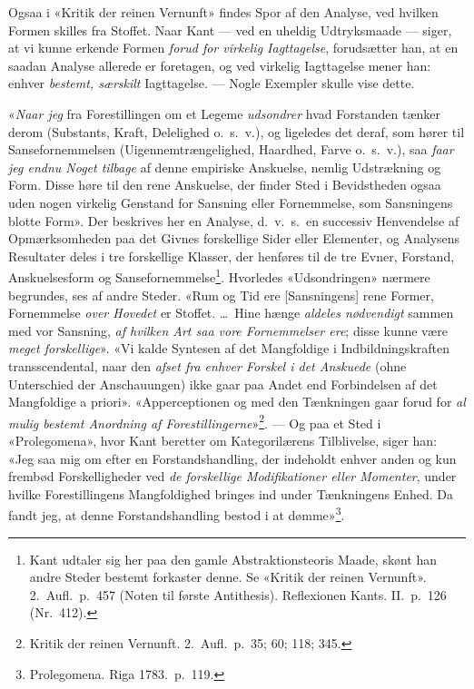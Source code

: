 \documentclass[12pt,a4paper]{article}
\begin{document}
Ogsaa i «Kritik der reinen Vernunft» findes Spor af den Analyse, ved
hvilken Formen skilles fra Stoffet. Naar Kant --- ved en uheldig
Udtryksmaade --- siger, at vi kunne erkende Formen \emph{forud for virkelig
Iagttagelse}, forudsætter han, at en saadan Analyse allerede er foretagen,
og ved virkelig Iagttagelse mener han: enhver \emph{bestemt, særskilt}
Iagttagelse. --- Nogle Exempler skulle vise dette.

«\emph{Naar jeg} fra Forestillingen om et Legeme \emph{udsondrer} hvad Forstanden
tænker derom (Substants, Kraft, Delelighed o.\ s.\ v.), og ligeledes det
deraf, som hører til Sansefornemmelsen (Uigennemtrængelighed, Haardhed,
Farve o.\ s.\ v.), saa \emph{faar jeg endnu Noget tilbage} af denne empiriske
Anskuelse, nemlig Udstrækning og Form. Disse høre til den rene Anskuelse,
der finder Sted i Bevidstheden ogsaa uden nogen virkelig Genstand for
Sansning eller Fornemmelse, som Sansningens blotte Form». Der beskrives
her en Analyse, d.\ v.\ s.\ en successiv Henvendelse af Opmærksomheden
paa det Givnes forskellige Sider eller Elementer, og Analysens Resultater
deles i tre forskellige Klasser, der henføres til de tre Evner, Forstand,
Anskuelsesform og Sansefornemmelse\footnote{Kant udtaler sig her paa den
gamle Abstraktionsteoris Maade, skønt han andre Steder bestemt forkaster
denne. Se «Kritik der reinen Vernunft». 2.\ Aufl.\ p.\ 457 (Noten til
første Antithesis). Reflexionen Kants. II.\ p.\ 126 (Nr.\
412).}. Hvorledes «Udsondringen» nærmere begrundes, ses af andre Steder.
«Rum og Tid ere [Sansningens] rene Former, Fornemmelse \emph{over Hovedet} er
Stoffet. \ldots\ Hine hænge \emph{aldeles nødvendigt} sammen med vor Sansning,
\emph{af hvilken Art saa vore Fornemmelser ere}; disse kunne være \emph{meget
forskellige}». «Vi kalde Syntesen af det Mangfoldige i Indbildningskraften
transscendental, naar den \emph{afset fra enhver Forskel i det Anskuede}
(ohne Unterschied der Anschauungen) ikke gaar paa Andet end
Forbindelsen af det Mangfoldige a priori». «Apperceptionen og med den
Tænkningen gaar forud for \emph{al mulig bestemt Anordning af
Forestillingerne}»\footnote{Kritik der reinen Vernunft. 2.\
Aufl.\ p.\ 35; 60; 118; 345.}. --- Og paa et Sted i «Prolegomena», hvor
Kant beretter om Kategorilærens Tilblivelse, siger han: «Jeg saa mig om
efter en Forstandshandling, der indeholdt enhver anden og kun frembød
Forskelligheder ved \emph{de forskellige Modifikationer eller Momenter}, under
hvilke Forestillingens Mangfoldighed bringes ind under Tænkningens Enhed.
Da fandt jeg, at denne Forstandshandling bestod i at
dømme»\footnote{Prolegomena. Riga 1783.\ p.\ 119.}.
\end{document}
